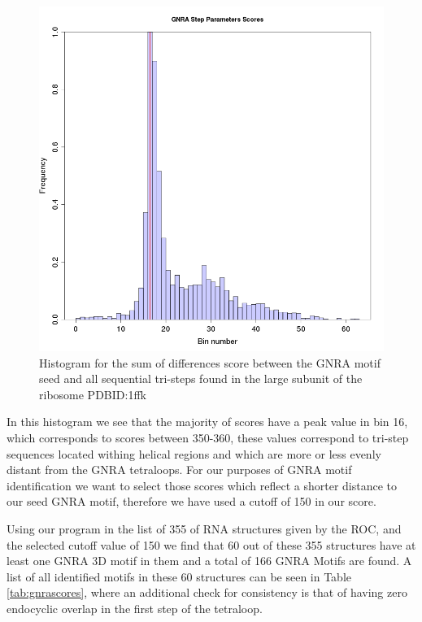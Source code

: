 \begin{figure}
\centering 
\includegraphics[angle=0, scale=0.5]{Chapter5/gnrahisto.png}
\caption{Histogram for  the sum of differences score  between the GNRA
  motif seed and  all sequential tri-steps found in  the large subunit
  of the ribosome PDBID:1ffk}
\label{fig:gnrahist}
\end{figure}

In this histogram we see that the majority of scores have a peak value
in bin 16,  which corresponds to scores between  350-360, these values
correspond to  tri-step sequences located withing  helical regions and
which are  more or less evenly  distant from the  GNRA tetraloops. For
our  purposes of  GNRA motif  identification we  want to  select those
scores  which reflect  a  shorter  distance to  our  seed GNRA  motif,
therefore we have used a cutoff of 150 in our score.

Using our  program in the list of  355 of RNA structures  given by the
ROC, and the selected cutoff value of 150 we find that 60 out of these
355 structures have at least one GNRA  3D motif in them and a total of
166 GNRA Motifs are found. A list of all identified motifs in these 60
structures  can  be  seen  in  Table  \ref{tab:gnrascores},  where  an
additional  check for consistency  is that  of having  zero endocyclic
overlap in the first step of the tetraloop.

